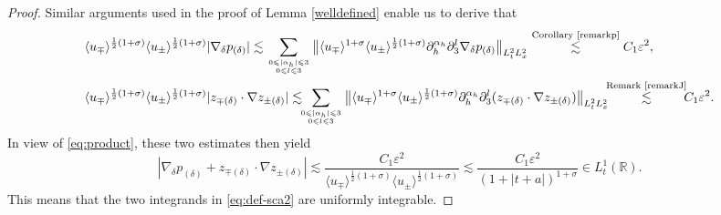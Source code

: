\documentclass[10pt,reqno]{amsart}
\numberwithin{equation}{section}
\begin{document}
\begin{proof}

  

Similar arguments used in the proof of Lemma \ref{welldefined} 
enable us to derive that 
\begin{align*}
&	 \langle u_\mp\rangle^{\frac{1}{2}(1+\sigma)}\langle u_\pm\rangle^{\frac{1}{2}(1+\sigma)} |\nabla_\delta p_{(\delta)}|
	\lesssim 
	\sum_{0\leqslant|\alpha_h|\leqslant 3\atop 0\leqslant l\leqslant 3}\big\|\langle u_\mp\rangle^{1+\sigma}\langle u_\pm\rangle^{\frac{1}{2}(1+\sigma)}\partial_{h}^{\alpha_h}\partial_3^l \nabla_\delta p_{(\delta)}\big\|_{L^2_tL^2_x}
	\stackrel{\text{Corollary \ref{remarkp}}}{\lesssim}C_1\varepsilon^2,\\
&	\langle u_\mp\rangle^{\frac{1}{2}(1+\sigma)}\langle u_\pm\rangle^{\frac{1}{2}(1+\sigma)} |z_{\mp(\delta)}\cdot\nabla z_{\pm(\delta)}|
	\lesssim\!\!\! 
	\sum_{0\leqslant|\alpha_h|\leqslant 3\atop 0\leqslant l\leqslant 3}\big\|\langle u_\mp\rangle^{1+\sigma}\langle u_\pm\rangle^{\frac{1}{2}(1+\sigma)}\partial_{h}^{\alpha_h}\partial_3^l (z_{\mp(\delta)}\cdot\nabla z_{\pm(\delta)})\big\|_{L^2_tL^2_x}
\!\!\!	\stackrel{\text{Remark \ref{remarkJ}}}{\lesssim}\!\!\! C_1\varepsilon^2.
\end{align*}
In view of \eqref{eq:product}, these two estimates then yield
\begin{equation*}
	|\nabla_\delta p_{(\delta)}+z_{\mp(\delta)}\cdot \nabla z_{\pm(\delta)}|\lesssim\frac{C_1\varepsilon^2}{\langle u_\mp\rangle^{\frac{1}{2}(1+\sigma)}\langle u_\pm\rangle^{\frac{1}{2}(1+\sigma)}}\lesssim\frac{C_1\varepsilon^2}{(1+|t+a|)^{1+\sigma}}\in L_t^1(\mathbb{R}).
\end{equation*}
This means that the two integrands in \eqref{eq:def-sca2} are uniformly integrable. 


\end{proof}
\end{document}
